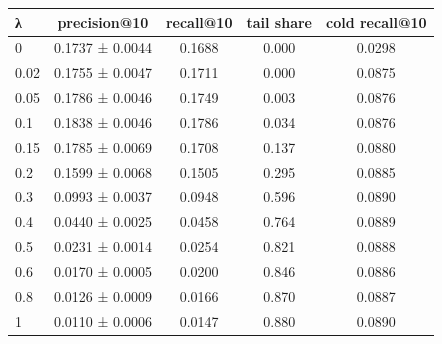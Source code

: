 \begin{tabular}{lcccc}
\toprule
λ & precision@10 & recall@10 & tail share & cold recall@10 \\
\midrule
0 & 0.1737 ± 0.0044 & 0.1688 & 0.000 & 0.0298 \\
0.02 & 0.1755 ± 0.0047 & 0.1711 & 0.000 & 0.0875 \\
0.05 & 0.1786 ± 0.0046 & 0.1749 & 0.003 & 0.0876 \\
0.1 & 0.1838 ± 0.0046 & 0.1786 & 0.034 & 0.0876 \\
0.15 & 0.1785 ± 0.0069 & 0.1708 & 0.137 & 0.0880 \\
0.2 & 0.1599 ± 0.0068 & 0.1505 & 0.295 & 0.0885 \\
0.3 & 0.0993 ± 0.0037 & 0.0948 & 0.596 & 0.0890 \\
0.4 & 0.0440 ± 0.0025 & 0.0458 & 0.764 & 0.0889 \\
0.5 & 0.0231 ± 0.0014 & 0.0254 & 0.821 & 0.0888 \\
0.6 & 0.0170 ± 0.0005 & 0.0200 & 0.846 & 0.0886 \\
0.8 & 0.0126 ± 0.0009 & 0.0166 & 0.870 & 0.0887 \\
1 & 0.0110 ± 0.0006 & 0.0147 & 0.880 & 0.0890 \\
\bottomrule
\end{tabular}

